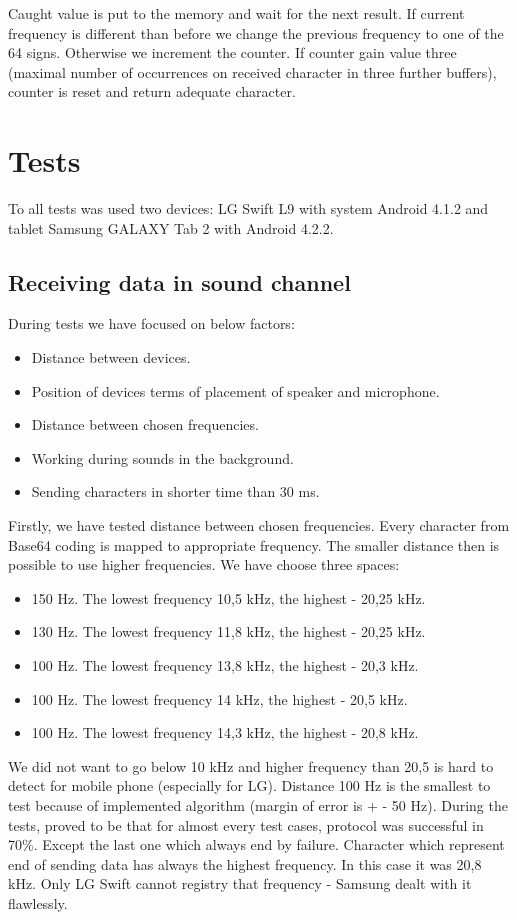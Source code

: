 \documentclass[11pt,titlepage]{article}
\theoremstyle{plain}
\begin{document}
Caught value is put to the memory and wait for the next result. If current frequency is different than before we change the previous frequency to one of the 64 signs. Otherwise we increment the counter. If counter gain value three (maximal number of occurrences on received character in three further buffers), counter is reset and return adequate character.


\section{Tests}
To all tests was used two devices: LG Swift L9 with system Android 4.1.2 and tablet Samsung GALAXY Tab 2 with Android 4.2.2. 

\subsection{Receiving data in sound channel}
During tests we have focused on below factors:
\begin{itemize}
\item Distance between devices.
\item Position of devices terms of placement of speaker and microphone.
\item Distance between chosen frequencies.
\item Working during sounds in the background.
\item Sending characters in shorter time than 30 ms.
\end{itemize}

Firstly, we have tested distance between chosen frequencies. Every character from Base64 coding is mapped to appropriate frequency. The smaller distance then is possible to use higher frequencies. We have choose three spaces:
\begin{itemize}
\item 150 Hz. The lowest frequency 10,5 kHz, the highest - 20,25 kHz.
\item 130 Hz. The lowest frequency 11,8 kHz, the highest - 20,25 kHz.
\item 100 Hz. The lowest frequency 13,8 kHz, the highest - 20,3 kHz.
\item 100 Hz. The lowest frequency 14 kHz, the highest - 20,5 kHz.
\item 100 Hz. The lowest frequency 14,3 kHz, the highest - 20,8 kHz.
\end{itemize}
We did not want to go below 10 kHz and higher frequency than 20,5 is hard to detect for mobile phone (especially for LG). Distance 100 Hz is the smallest to test because of implemented algorithm (margin of error is + - 50 Hz). During the tests, proved to be that for almost every test cases, protocol was successful in 70\%. Except the last one which always end by failure. Character which represent end of sending data has always the highest frequency. In this case it was 20,8 kHz. Only LG Swift cannot registry that frequency - Samsung dealt with it flawlessly.
\end{document}
